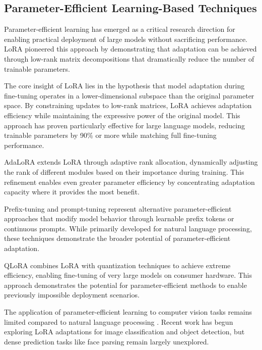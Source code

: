 \documentclass[12pt,a4paper]{report}
\begin{document}
\subsection{Parameter-Efficient Learning-Based Techniques}

Parameter-efficient learning has emerged as a critical research direction for enabling practical deployment of large models without sacrificing performance. LoRA \cite{hu2021lora} pioneered this approach by demonstrating that adaptation can be achieved through low-rank matrix decompositions that dramatically reduce the number of trainable parameters.

The core insight of LoRA lies in the hypothesis that model adaptation during fine-tuning operates in a lower-dimensional subspace than the original parameter space. By constraining updates to low-rank matrices, LoRA achieves adaptation efficiency while maintaining the expressive power of the original model. This approach has proven particularly effective for large language models, reducing trainable parameters by 90\% or more while matching full fine-tuning performance.

AdaLoRA \cite{zhang2023adalora} extends LoRA through adaptive rank allocation, dynamically adjusting the rank of different modules based on their importance during training. This refinement enables even greater parameter efficiency by concentrating adaptation capacity where it provides the most benefit.

Prefix-tuning \cite{li2021prefix} and prompt-tuning \cite{lester2021power} represent alternative parameter-efficient approaches that modify model behavior through learnable prefix tokens or continuous prompts. While primarily developed for natural language processing, these techniques demonstrate the broader potential of parameter-efficient adaptation.

QLoRA \cite{dettmers2023qlora} combines LoRA with quantization techniques to achieve extreme efficiency, enabling fine-tuning of very large models on consumer hardware. This approach demonstrates the potential for parameter-efficient methods to enable previously impossible deployment scenarios.

The application of parameter-efficient learning to computer vision tasks remains limited compared to natural language processing \cite{kim2022parameter}. Recent work has begun exploring LoRA adaptations for image classification and object detection, but dense prediction tasks like face parsing remain largely unexplored.
\end{document}
